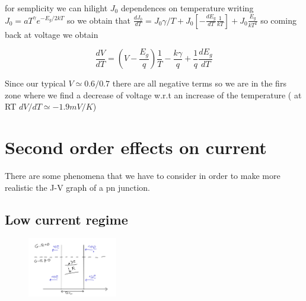 for semplicity we can hilight $J_0$ dependences on temperature writing $J_0=aT^\gamma e^{-E_g/2kT}$ so we obtain that $\frac{dJ_0}{dT}=J_0\gamma/T+J_0[-\frac{dE_g}{dT}\frac{1}{kT}] + J_0 \frac{E_g}{kT^2}$ so coming back at voltage we obtain

\begin{equation}
\frac{dV}{dT}=(V-\frac{E_g}{q})\frac{1}{T}-\frac{k\gamma}{q} + \frac{1}{q}\frac{dE_g}{dT}
\end{equation}

Since our typical $V\simeq0.6/0.7$ there are all negative terms so we are in the firs zone where we find a decrease of voltage w.r.t an increase of the temperature ( at RT $dV/dT\simeq -1.9mV/K$)

\section{Second order effects on current}
There are some phenomena that we have to consider in order to make more realistic the J-V graph of a pn junction.
\subsection{Low current regime}

\begin{figure}
\includegraphics[width=0.35\textwidth]{Rdl.png}
\end{figure}

